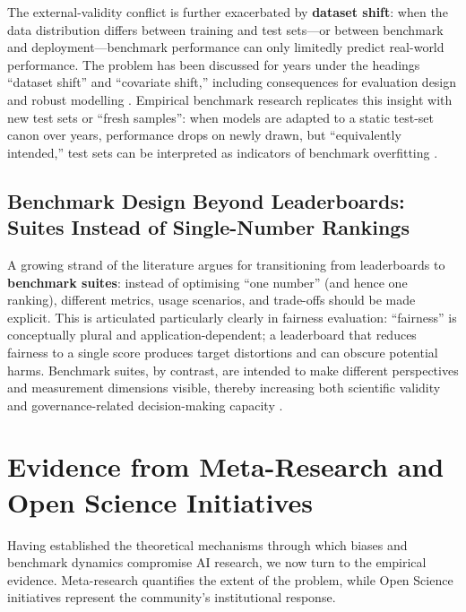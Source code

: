 \documentclass[12pt, a4paper]{article}
\begin{document}
The external-validity conflict is further exacerbated by
\textbf{dataset shift}: when the data distribution differs between
training and test sets---or between benchmark and deployment---benchmark
performance can only limitedly predict real-world performance.  The
problem has been discussed for years under the headings ``dataset
shift'' and ``covariate shift,'' including consequences for evaluation
design and robust modelling \cite{QuinoneroCandela2009}.  Empirical
benchmark research replicates this insight with new test sets or ``fresh
samples'': when models are adapted to a static test-set canon over
years, performance drops on newly drawn, but ``equivalently intended,''
test sets can be interpreted as indicators of benchmark overfitting
\cite{Recht2019}.

\subsection{Benchmark Design Beyond Leaderboards: Suites Instead of
            Single-Number Rankings}
\label{sec:suites}

A growing strand of the literature argues for transitioning from
leaderboards to \textbf{benchmark suites}: instead of optimising ``one
number'' (and hence one ranking), different metrics, usage scenarios,
and trade-offs should be made explicit.  This is articulated
particularly clearly in fairness evaluation: ``fairness'' is
conceptually plural and application-dependent; a leaderboard that
reduces fairness to a single score produces target distortions and can
obscure potential harms.  Benchmark suites, by contrast, are intended to
make different perspectives and measurement dimensions visible, thereby
increasing both scientific validity and governance-related
decision-making capacity \cite{Wang2024}.

\section{Evidence from Meta-Research and Open Science Initiatives}
\label{sec:meta}

Having established the theoretical mechanisms through which biases and
benchmark dynamics compromise AI research, we now turn to the empirical
evidence.  Meta-research quantifies the extent of the problem, while
Open Science initiatives represent the community's institutional
response.
\end{document}
